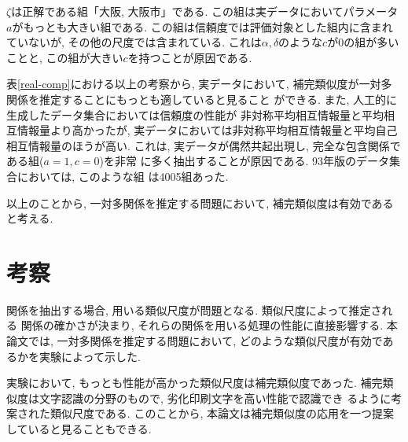 $\zeta$は正解である組「大阪, 大阪市」である. 
この組は実データにおいてパラメータ$a$がもっとも大きい組である. 
この組は信頼度では評価対象とした組内に含まれていないが, 
その他の尺度では含まれている. 
これは$\alpha,\delta$のような$c$が$0$の組が多いことと, 
この組が大きい$c$を持つことが原因である. 

表\ref{real-comp}における以上の考察から, 実データにおいて, 
補完類似度が一対多関係を推定することにもっとも適していると見ること
ができる. 
また, 人工的に生成したデータ集合においては信頼度の性能が
非対称平均相互情報量と平均相互情報量より高かったが, 実データにおいては非対称平均相互情報量と平均自己相互情報量のほうが高い. 
これは, 実データが偶然共起出現し, 完全な包含関係である組($a=1,c=0$)を非常
に多く抽出することが原因である. 93年版のデータ集合においては, このような組
は4005組あった. 

以上のことから, 一対多関係を推定する問題において,
補完類似度は有効であると考える. 

\section{考察}
関係を抽出する場合, 用いる類似尺度が問題となる. 類似尺度によって推定される
関係の確かさが決まり, それらの関係を用いる処理の性能に直接影響する. 
本論文では, 一対多関係を推定する問題において, 
どのような類似尺度が有効であるかを実験によって示した. 

実験において, もっとも性能が高かった類似尺度は補完類似度であった. 
補完類似度は文字認識の分野のもので, 劣化印刷文字を高い性能で認識でき
るように考案された類似尺度である\cite{Hagita95,Sawaki95a,Sawaki95b}.
このことから, 本論文は補完類似度の応用を一つ提案していると見ることもできる. 

